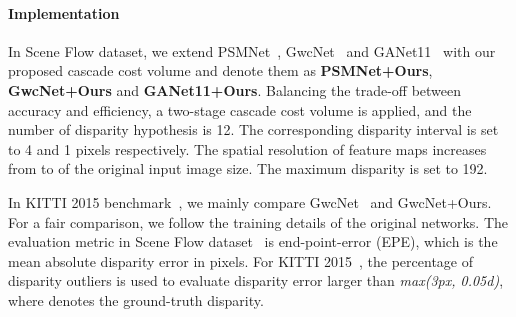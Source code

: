 \documentclass[10pt,twocolumn,letterpaper]{article}
\begin{document}
\paragraph{Implementation}\vspace{-3mm}
In Scene Flow dataset, we extend PSMNet~\cite{chang2018pyramid}, GwcNet~\cite{guo2019group} and GANet11~\cite{zhang2019ga} with our proposed cascade cost volume and denote them as \textbf{PSMNet+Ours}, \textbf{GwcNet+Ours} and \textbf{GANet11+Ours}.
Balancing the trade-off between accuracy and efficiency, a two-stage cascade cost volume is applied, and the number of disparity hypothesis is 12.
The corresponding disparity interval is set to 4 and 1 pixels respectively.
The spatial resolution of feature maps increases from  to  of the original input image size.
The maximum disparity is set to 192.

In KITTI 2015 benchmark~\cite{menze2015object}, we mainly compare GwcNet~\cite{guo2019group} and GwcNet+Ours.
For a fair comparison, we follow the training details of the original networks.  
The evaluation metric in Scene Flow dataset~\cite{mayer2016large} is end-point-error (EPE), which is the mean absolute disparity error in pixels.
For KITTI 2015~\cite{menze2015object}, the percentage of disparity outliers  is used to evaluate disparity error larger than \textit{max(3px, 0.05d)}, where  denotes the ground-truth disparity.

\begin{table}[t]
\begin{center}
\footnotesize
{}
\end{center}
\vspace{-5mm}
\caption{Quantitative results of different stereo matching methods with and without cascade cost volume on Scene Flow dataset~\cite{mayer2016large}. Accuracy, GPU memory consumption and run-time are included for comparisons.}
\label{tab:stereo_sceneflow}
\end{table}
\end{document}
